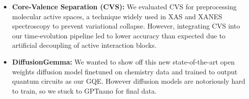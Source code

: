 \documentclass[11pt]{article}
\begin{document}
\begin{itemize}[leftmargin=*,noitemsep,topsep=0pt]
  \item \textbf{Core-Valence Separation (CVS):} We evaluated CVS for preprocessing molecular active spaces, a technique widely used in XAS and XANES spectroscopy to prevent variational collapse. However, integrating CVS into our time-evolution pipeline led to lower accuracy than expected due to artificial decoupling of active interaction blocks.
  \item \textbf{DiffusionGemma:} We wanted to show off this new state-of-the-art open weights diffusion model finetuned on chemistry data and trained to output quantum circuits as our GQE. However diffusion models are notoriously hard to train, so we stuck to GPTnano for final data.
\end{itemize}

\newpage


\end{document}
